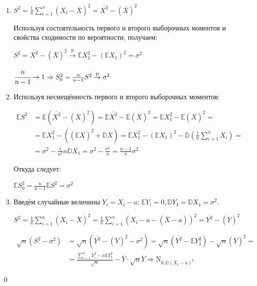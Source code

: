 \documentclass[oneside,final,14pt]{extreport}
\renewenvironment{proof}{{\bfseries Доказательство.}}{\qed}
\theoremstyle{definition}
\begin{document}
\begin{proof}
\begin{enumerate}
    \item \( S^{2}=\frac{1}{n} \sum_{i=1}^{n}\left(X_{i}-\overline{X}\right)^{2}=\overline{X^{2}}-(\overline{X})^{2} \)

    Используя состоятельность первого и второго выборочных моментов и свойства сходимости по вероятности, получаем:

    \( S^{2}=\overline{X^{2}}-(\overline{X})^{2} \stackrel{\mathrm{p}}{\longrightarrow} \mathbb{E} X_{1}^{2}-\left(\mathbb{E} X_{1}\right)^{2}=\sigma^{2} \)
    
    \( \cfrac{n}{n-1} \rightarrow 1 \Rightarrow S_{0}^{2}=\frac{n}{n-1} S^{2} \stackrel{\mathrm{p}}{\rightarrow} \sigma^{2} \)
    \item Используя несмещённость первого и второго выборочных моментов:
    
    \(
    \begin{aligned}
\mathbb{E} S^{2} &=\mathbb{E}\left(\overline{X^{2}}-(\overline{X})^{2}\right)=\mathbb{E} \overline{X^{2}}-\mathbb{E}(\overline{X})^{2}=\mathbb{E} X_{1}^{2}-\mathbb{E}(\overline{X})^{2}=\\
&=\mathbb{E} X_{1}^{2}-\left((\mathbb{E} \overline{X})^{2}+\mathbb{D} \overline{X}\right)=\mathbb{E} X_{1}^{2}-\left(\mathbb{E} X_{1}\right)^{2}-\mathbb{D}\left(\frac{1}{n} \sum_{i=1}^{n} X_{i}\right)=\\
&=\sigma^{2}-\frac{1}{n^{2}} n \mathbb{D} X_{1}=\sigma^{2}-\frac{\sigma^{2}}{n}=\frac{n-1}{n} \sigma^{2}
\end{aligned}
    \)
    
    Откуда следует:
    
    \( \mathbb{E} S_{0}^{2}=\frac{n}{n-1} \mathbb{E} S^{2}=\sigma^{2} \)
    
    \item Введём случайные величины \( Y_{i}=X_{i}-a \); \( \mathbb{E}Y_{i} = 0, \mathbb{D} Y_{1}=\mathbb{D} X_{1}=\sigma^{2} \).
    
    \( S^{2}=\frac{1}{n} \sum_{i=1}^{n}\left(X_{i}-\overline{X}\right)^{2}=\frac{1}{n} \sum_{i=1}^{n}\left(X_{i}-a-(\overline{X}-a)\right)^{2}=\overline{Y^{2}}-(\overline{Y})^{2} \)
    
    \( \begin{aligned}
\sqrt{n}\left(S^{2}-\sigma^{2}\right) &=\sqrt{n}\left(\overline{Y^{2}}-(\overline{Y})^{2}-\sigma^{2}\right)=\sqrt{n}\left(\overline{Y^{2}}-\mathbb{E} Y_{1}^{2}\right)-\sqrt{n}(\overline{Y})^{2}=\\
&=\frac{\sum_{i=1}^{n} Y_{i}^{2}-n \mathbb{E} Y_{1}^{2}}{\sqrt{n}}-\overline{Y} \cdot \sqrt{n} \overline{Y} \Rightarrow \mathrm{N}_{0, \mathbb{D}\left(X_{1}-a\right)^{2}}
\end{aligned} \)


\end{enumerate}
\end{proof}
\end{document}
